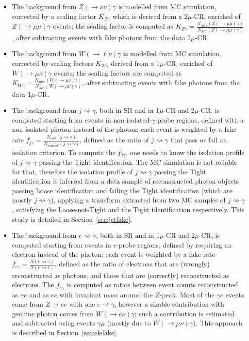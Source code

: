 \begin{itemize}
\item The background from $Z(\to\nu\nu)\gamma$ is modelled from MC simulation, corrected by a scaling factor $K_{Z\gamma}$ which is derived from a 2$\mu$-CR, enriched of $Z(\to\mu\mu)\gamma$ events; the scaling factor is computed as
  $\displaystyle K_{Z\gamma}=\frac{N_{data}(Z(\to\mu\mu)\gamma)}{N_{MC}(Z(\to\mu\mu)\gamma)}$, after subtracting events with fake photons from the data 2$\mu$-CR.
\item The background from $W(\to\ell\nu)\gamma$ is modelled from MC simulation, corrected by scaling factors $K_{W\gamma}$ derived from a 1$\mu$-CR, enriched of $W(\to\mu\nu)\gamma$ events; the scaling factors are computed as
  $\displaystyle K_{W\gamma}=\frac{N_{data}(W(\to\mu\nu)\gamma)}{N_{MC}(W(\to\mu\nu)\gamma)}$, after subtracting events with fake photons from the data 1$\mu$-CR.
\item The background from $j\rightsquigarrow\gamma$, both in SR and in 1$\mu$-CR and 2$\mu$-CR, is computed starting from events in non-isolated-$\gamma$-probe regions, defined with a non-isolated photon instead of the photon; each event is weighted by a fake rate
  $\displaystyle f_{j\gamma}=\frac{N_{isol}(j\rightsquigarrow\gamma)}{N_{nonisol}(j\rightsquigarrow\gamma)}$, defined as the ratio of $j\rightsquigarrow\gamma$ that pass or fail an isolation criterion. 
  To compute the $f_{j\gamma}$, one needs to know the isolation profile of $j\rightsquigarrow\gamma$ passing the Tight identification. The MC simulation is not reliable for that, therefore the isolation profile of $j\rightsquigarrow\gamma$ passing the Tight identification is inferred from a data sample of reconstructed photon objects passing Loose identification and failing the Tight identification (which are mostly $j\rightsquigarrow\gamma$), applying a transform extracted from two MC samples of $j\rightsquigarrow\gamma$, satisfying the Loose-not-Tight and the Tight identification respectively.
  This study is detailed in Section~\ref{sec:jetfake}.
\item The background from $e\rightsquigarrow\gamma$, both in SR and in 1$\mu$-CR and 2$\mu$-CR, is computed starting from events in $e$-probe regions, defined by requiring an electron instead of the photon; each event is weighted by a fake rate
  $\displaystyle f_{e\gamma}=\frac{N(e\rightsquigarrow\gamma)}{N(e\rightsquigarrow e)}$, defined as the ratio of electrons that are (wrongly) reconstructed as photons, and those that are (correctly) reconstructed as electrons.
  The $f_{e\gamma}$ is computed as ratios between event counts reconstructed as $\gamma e$ and as $ee$ with invariant mass around the $Z$-peak. Most of the $\gamma e$ events come from $Z\to ee$ with one $e\rightsquigarrow\gamma$, however a sizable contribution with genuine photon comes from $W(\to e\nu)\gamma$: such a contribution is estimated and subtracted using events $\gamma\mu$ (mostly due to $W(\to\mu\nu)\gamma$). This approach is described in Section~\ref{sec:elefake}.
\end{itemize}

\clearpage

